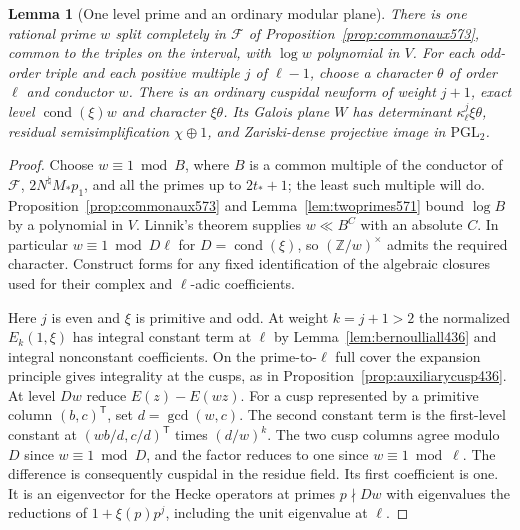 \documentclass[a4paper,11pt]{article}
\newtheorem{lemma}[proposition]{Lemma}
\theoremstyle{definition}
\theoremstyle{remark}
\newcommand{\ZZ}{\mathbb Z}\newcommand{\ord}{\operatorname{ord}}
\numberwithin{equation}{section}
\begin{document}
\begin{lemma}[One level prime and an ordinary modular plane]
\leavevmode\label{lem:cuspidalplane577}
There is one rational prime \(w\) split completely in
\(\mathcal F\) of Proposition~\ref{prop:commonaux573}, common
to the triples on the interval, with \(\log w\) polynomial in
\(V\). For each odd-order triple and each positive multiple
\(j\) of \(\ell-1\), choose a character \(\theta\) of order
\(\ell\) and conductor \(w\). There is an ordinary cuspidal
newform of weight \(j+1\), exact level \(\operatorname{cond}(\xi)w\)
and character \(\xi\theta\). Its Galois plane \(W\) has
determinant \(\kappa_\ell^j\xi\theta\), residual
semisimplification \(\chi\oplus1\), and Zariski-dense
projective image in \(\mathrm{PGL}_2\).
\end{lemma}
\begin{proof}
Choose \(w\equiv1\bmod B\), where \(B\) is a common multiple of
the conductor of \(\mathcal F\), \(2N^\natural M_*p_1\), and
all the primes up to \(2t_*+1\); the least such multiple will
do. Proposition~\ref{prop:commonaux573} and
Lemma~\ref{lem:twoprimes571} bound \(\log B\) by a polynomial
in \(V\). Linnik's theorem supplies \(w\ll B^{C}\) with an
absolute \(C\). In particular \(w\equiv1\bmod D\ell\) for
\(D=\operatorname{cond}(\xi)\), so \((\ZZ/w)^\times\) admits
the required character. Construct forms for any fixed
identification of the algebraic closures used for their
complex and \(\ell\)-adic coefficients.

Here \(j\) is even and \(\xi\) is primitive and odd.
At weight \(k=j+1>2\) the normalized \(E_k(1,\xi)\)
has integral constant term at \(\ell\) by
Lemma~\ref{lem:bernoulliall436} and integral nonconstant
coefficients. On the prime-to-\(\ell\) full cover the
expansion principle gives integrality at the cusps, as in
Proposition~\ref{prop:auxiliarycusp436}. At level \(Dw\) reduce
\(E(z)-E(wz)\). For a cusp represented by a primitive column
\((b,c)^{\mathsf T}\), set \(d=\gcd(w,c)\). The second constant
term is the first-level constant at
\((wb/d,c/d)^{\mathsf T}\) times \((d/w)^k\). The two cusp
columns agree modulo \(D\) since \(w\equiv1\bmod D\), and the
factor reduces to one since \(w\equiv1\bmod\ell\). The
difference is consequently cuspidal in the residue field.
Its first coefficient is one. It is an eigenvector for the
Hecke operators at primes \(p\nmid Dw\) with eigenvalues the
reductions of \(1+\xi(p)p^j\), including the unit eigenvalue
at \(\ell\).


\end{proof}
\end{document}
